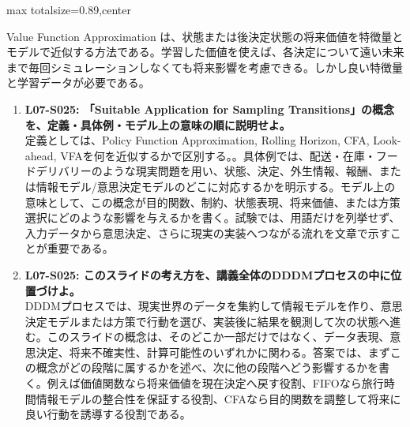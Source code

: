 \begin{minipage}[t]{0.58\textwidth}
\begin{adjustbox}{max totalsize={\textwidth}{0.89\textheight},center}
\begin{minipage}{\textwidth}
Value Function Approximation は、状態または後決定状態の将来価値を特徴量とモデルで近似する方法である。学習した価値を使えば、各決定について遠い未来まで毎回シミュレーションしなくても将来影響を考慮できる。しかし良い特徴量と学習データが必要である。\par{}\begin{enumerate}\item \textbf{L07-S025: 「Suitable Application for Sampling Transitions」の概念を、定義・具体例・モデル上の意味の順に説明せよ。}\\定義としては、Policy Function Approximation, Rolling Horizon, CFA, Look-ahead, VFAを何を近似するかで区別する。。具体例では、配送・在庫・フードデリバリーのような現実問題を用い、状態、決定、外生情報、報酬、または情報モデル/意思決定モデルのどこに対応するかを明示する。モデル上の意味として、この概念が目的関数、制約、状態表現、将来価値、または方策選択にどのような影響を与えるかを書く。試験では、用語だけを列挙せず、入力データから意思決定、さらに現実の実装へつながる流れを文章で示すことが重要である。\item \textbf{L07-S025: このスライドの考え方を、講義全体のDDDMプロセスの中に位置づけよ。}\\DDDMプロセスでは、現実世界のデータを集約して情報モデルを作り、意思決定モデルまたは方策で行動を選び、実装後に結果を観測して次の状態へ進む。このスライドの概念は、そのどこか一部だけではなく、データ表現、意思決定、将来不確実性、計算可能性のいずれかに関わる。答案では、まずこの概念がどの段階に属するかを述べ、次に他の段階へどう影響するかを書く。例えば価値関数なら将来価値を現在決定へ戻す役割、FIFOなら旅行時間情報モデルの整合性を保証する役割、CFAなら目的関数を調整して将来に良い行動を誘導する役割である。\end{enumerate}
\end{minipage}
\end{adjustbox}
\end{minipage}


